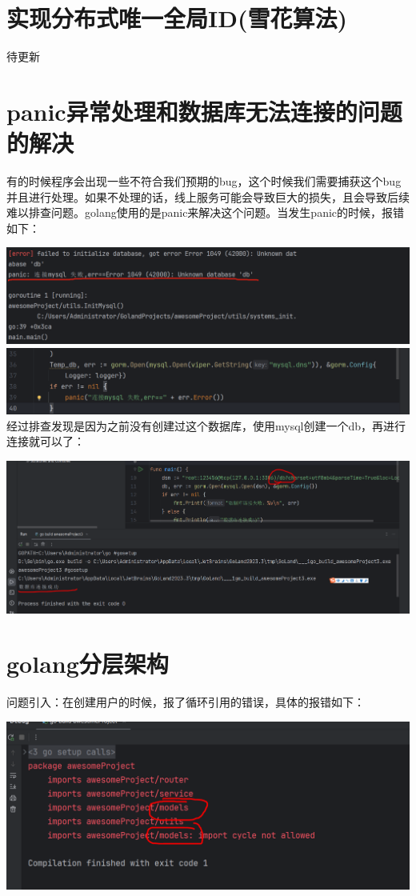 \documentclass[12pt]{article}
\begin{document}
	
	\section{实现分布式唯一全局ID(雪花算法)}
	待更新
	
	\section{panic异常处理和数据库无法连接的问题的解决}
	有的时候程序会出现一些不符合我们预期的bug，这个时候我们需要捕获这个bug并且进行处理。如果不处理的话，线上服务可能会导致巨大的损失，且会导致后续难以排查问题。golang使用的是panic来解决这个问题。当发生panic的时候，报错如下：
	
	\includegraphics[scale=0.5]{3.png}
	\includegraphics[scale=0.5]{4.png}
	经过排查发现是因为之前没有创建过这个数据库，使用mysql创建一个db，再进行连接就可以了：
	
	\includegraphics[scale=0.5]{5.png}
	
	\section{golang分层架构}
	问题引入：在创建用户的时候，报了循环引用的错误，具体的报错如下：
	
	\includegraphics{6.png}
	
\end{document}
